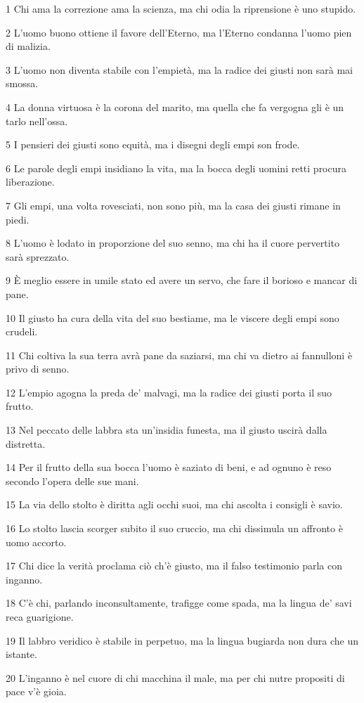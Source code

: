 \par 1 Chi ama la correzione ama la scienza, ma chi odia la riprensione è uno stupido.
\par 2 L'uomo buono ottiene il favore dell'Eterno, ma l'Eterno condanna l'uomo pien di malizia.
\par 3 L'uomo non diventa stabile con l'empietà, ma la radice dei giusti non sarà mai smossa.
\par 4 La donna virtuosa è la corona del marito, ma quella che fa vergogna gli è un tarlo nell'ossa.
\par 5 I pensieri dei giusti sono equità, ma i disegni degli empi son frode.
\par 6 Le parole degli empi insidiano la vita, ma la bocca degli uomini retti procura liberazione.
\par 7 Gli empi, una volta rovesciati, non sono più, ma la casa dei giusti rimane in piedi.
\par 8 L'uomo è lodato in proporzione del suo senno, ma chi ha il cuore pervertito sarà sprezzato.
\par 9 È meglio essere in umile stato ed avere un servo, che fare il borioso e mancar di pane.
\par 10 Il giusto ha cura della vita del suo bestiame, ma le viscere degli empi sono crudeli.
\par 11 Chi coltiva la sua terra avrà pane da saziarsi, ma chi va dietro ai fannulloni è privo di senno.
\par 12 L'empio agogna la preda de' malvagi, ma la radice dei giusti porta il suo frutto.
\par 13 Nel peccato delle labbra sta un'insidia funesta, ma il giusto uscirà dalla distretta.
\par 14 Per il frutto della sua bocca l'uomo è saziato di beni, e ad ognuno è reso secondo l'opera delle sue mani.
\par 15 La via dello stolto è diritta agli occhi suoi, ma chi ascolta i consigli è savio.
\par 16 Lo stolto lascia scorger subito il suo cruccio, ma chi dissimula un affronto è uomo accorto.
\par 17 Chi dice la verità proclama ciò ch'è giusto, ma il falso testimonio parla con inganno.
\par 18 C'è chi, parlando inconsultamente, trafigge come spada, ma la lingua de' savi reca guarigione.
\par 19 Il labbro veridico è stabile in perpetuo, ma la lingua bugiarda non dura che un istante.
\par 20 L'inganno è nel cuore di chi macchina il male, ma per chi nutre propositi di pace v'è gioia.

